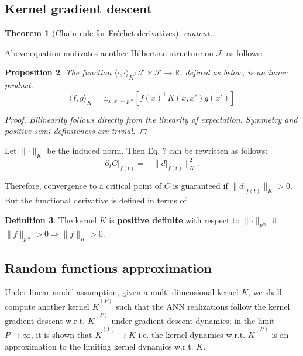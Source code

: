 \documentclass{article}
\theoremstyle{plain}
\newtheorem{theorem}{Theorem}
\newtheorem{proposition}[theorem]{Proposition}
\theoremstyle{definition}
\newtheorem{definition}[theorem]{Definition}
\theoremstyle{remark}
\begin{document}
\subsection{Kernel gradient descent}


\begin{theorem}[Chain rule for Fr\'{e}chet derivatives]
\label{thm:chain}
	content...
\end{theorem}

Above equation motivates another Hilbertian structure on $\mathcal{F}$ as follows:
\begin{proposition}
	The function $\langle \cdot, \cdot \rangle_K : \mathcal{F} \times \mathcal{F} \rightarrow \mathbb{R}$, defined as below, is an inner product.
	\begin{equation}
		\langle f, g \rangle_K = \mathbb{E}_{x, x' \sim p^{in}} \left[ f(x)^\intercal K(x, x') g(x') \right]
	\end{equation}
	\begin{proof}
		Bilinearity follows directly from the linearity of expectation.
		Symmetry and positive semi-definiteness are trivial.
	\end{proof}
\end{proposition}

Let $\lVert \cdot \rVert_K$ be the induced norm.
Then Eq. ? can be rewritten as follows:
\begin{equation}
	\partial_t C \rvert_{f(t)} = - \lVert d \rvert_{f(t)} \rVert_K^2.
\end{equation}

Therefore, convergence to a critical point of $C$ is guaranteed if $\lVert d \rvert_{f(t)} \rVert_K > 0$.
But the functional derivative is defined in terms of 


\begin{definition}
	The kernel $K$ is {\bf positive definite} with respect to $\lVert \cdot \rVert_{p^{in}}$ if $\lVert f \rVert_{p^{in}} > 0 \Rightarrow \lVert f \rVert_K > 0$.
\end{definition}



\subsection{Random functions approximation}
\begin{tcolorbox}
	Under linear model assumption, given a multi-dimensional kernel $K$, we shall compute another kernel $\tilde{K}^{(P)}$ such that the ANN realizations follow the kernel gradient descent w.r.t. $\tilde{K}^{(P)}$ under gradient descent dynamics; in the limit $P \rightarrow \infty$, it is shown that $\tilde{K}^{(P)} \rightarrow K$ i.e. the kernel dynamics w.r.t. $\tilde{K}^{(P)}$ is an approximation to the limiting kernel dynamics w.r.t. $K$.
\end{tcolorbox}
\end{document}
